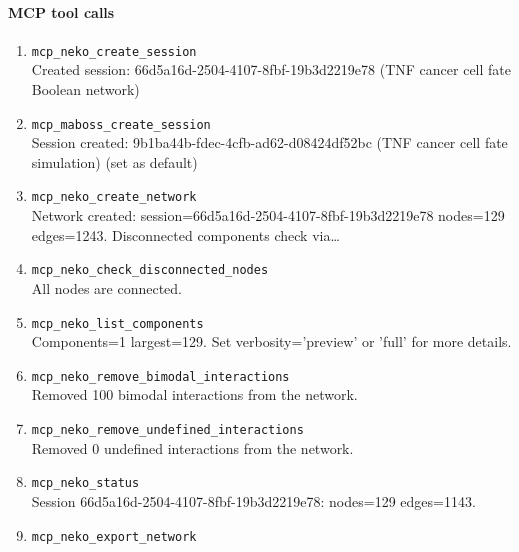 \paragraph{MCP tool calls}
\begingroup
\small
\setlength{\itemsep}{5pt}
\setlength{\parskip}{0pt}
\begin{enumerate}
\item[1.] \texttt{mcp\_\allowbreak{}neko\_\allowbreak{}create\_\allowbreak{}session}
\hfill\\
\RaggedRight Created session: 66d5a16d-2504-4107-8fbf-19b3d2219e78 (TNF cancer cell fate Boolean network)
\item[2.] \texttt{mcp\_\allowbreak{}maboss\_\allowbreak{}create\_\allowbreak{}session}
\hfill\\
\RaggedRight Session created: 9b1ba44b-fdec-4cfb-ad62-d08424df52bc (TNF cancer cell fate simulation) (set as default)
\item[3.] \texttt{mcp\_\allowbreak{}neko\_\allowbreak{}create\_\allowbreak{}network}
\hfill\\
\RaggedRight Network created: session=66d5a16d-2504-4107-8fbf-19b3d2219e78 nodes=129 edges=1243. Disconnected components check via\ldots{}
\item[4.] \texttt{mcp\_\allowbreak{}neko\_\allowbreak{}check\_\allowbreak{}disconnected\_\allowbreak{}nodes}
\hfill\\
\RaggedRight All nodes are connected.
\item[5.] \texttt{mcp\_\allowbreak{}neko\_\allowbreak{}list\_\allowbreak{}components}
\hfill\\
\RaggedRight Components=1 largest=129. Set verbosity='preview' or 'full' for more details.
\item[6.] \texttt{mcp\_\allowbreak{}neko\_\allowbreak{}remove\_\allowbreak{}bimodal\_\allowbreak{}interactions}
\hfill\\
\RaggedRight Removed 100 bimodal interactions from the network.
\item[7.] \texttt{mcp\_\allowbreak{}neko\_\allowbreak{}remove\_\allowbreak{}undefined\_\allowbreak{}interactions}
\hfill\\
\RaggedRight Removed 0 undefined interactions from the network.
\item[8.] \texttt{mcp\_\allowbreak{}neko\_\allowbreak{}status}
\hfill\\
\RaggedRight Session 66d5a16d-2504-4107-8fbf-19b3d2219e78: nodes=129 edges=1143.
\item[9.] \texttt{mcp\_\allowbreak{}neko\_\allowbreak{}export\_\allowbreak{}network}
\hfill\\

\end{enumerate}
